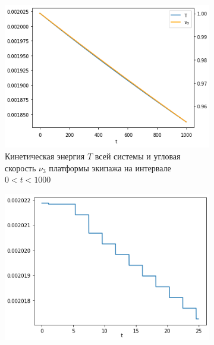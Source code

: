 \begin{figure}[htb]
    \centering
        \begin{subfigure}[t]{\textwidth}
            \centering
            \includegraphics[width=\linewidth]{content/pic/new/impact/impact_1_Tnu3_long.png}
            \vspace{-25pt}
            \caption{Кинетическая энергия $T$ всей системы и угловая скорость $\nu_3$ платформы экипажа на интервале $0 < t < 1000$}
            \label{fig:self_rot_T_long}
        \end{subfigure}
        \begin{subfigure}[t]{\textwidth}
            \vspace{15pt}
            \centering
            \includegraphics[width=\linewidth]{content/pic/new/impact/impact_1_T.png}

\end{subfigure}
\end{figure}
